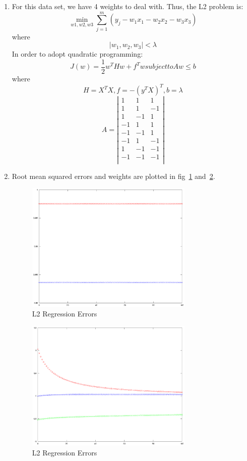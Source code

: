 \documentclass[a4paper, 12pt, titlepage]{article}
\begin{document}
\begin{enumerate}
            
        
    \item For this data set, we have 4 weights to deal with. Thus, the L2 problem is:
        $$\min_{w1, w2, w3} \sum^m_{j=1}(y_j-w_1x_1-w_2x_2-w_3x_3)$$
        where
        $$|w_1, w_2, w_3|<\lambda$$
        In order to adopt quadratic programming:
        $$J(w) = \frac{1}{2} w^THw + f^Tw subject to Aw\leq{}b$$
        where
        $$H = X^TX, f=-(y^TX)^T, b=\lambda$$
        \[A=
        \left|
        {\begin{array}{ccc}
                1 & 1 & 1\\
                1 & 1 & -1\\
                1 & -1 & 1\\
                -1 & 1 & 1\\
                -1 & -1 & 1\\
                -1 & 1 & -1\\
                1 & -1 & -1\\
                -1 & -1 & -1\\
        \end{array}}
        \right|
        \]
    \item Root mean squared errors and weights are plotted in fig~\ref{l1err} and~\ref{l1weight}.

            \begin{figure}[H]
                \centering
                \includegraphics[width=8cm]{L1Err.eps}
                \caption{L2 Regression Errors}\label{l1err}
            \end{figure}

            \begin{figure}[H]
                \centering
                \includegraphics[width=8cm]{L1Weight.eps}
                \caption{L2 Regression Errors}\label{l1weight}
            \end{figure}


\end{enumerate}
\end{document}
